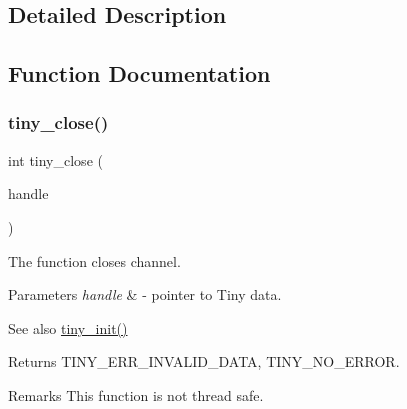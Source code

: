 \subsection{Detailed Description}


\subsection{Function Documentation}
\mbox{\label{group__SIMPLE__API_ga48cf9ffab9eeb9665e61ae69e28938b8}} 
\subsubsection{\texorpdfstring{tiny\+\_\+close()}{tiny\_close()}}
{\footnotesize\ttfamily int tiny\+\_\+close (\begin{DoxyParamCaption}\item[{\hyperlink{structSTinyData}{S\+Tiny\+Data} $\ast$}]{handle }\end{DoxyParamCaption})}

The function closes channel. 
\begin{DoxyParams}{Parameters}
{\em handle} & -\/ pointer to Tiny data. \\
\hline
\end{DoxyParams}
\begin{DoxySeeAlso}{See also}
\hyperlink{group__SIMPLE__API_gab9bfaed3c75551c8b7f3f8b25e766546}{tiny\+\_\+init()} 
\end{DoxySeeAlso}
\begin{DoxyReturn}{Returns}
T\+I\+N\+Y\+\_\+\+E\+R\+R\+\_\+\+I\+N\+V\+A\+L\+I\+D\+\_\+\+D\+A\+TA, T\+I\+N\+Y\+\_\+\+N\+O\+\_\+\+E\+R\+R\+OR. 
\end{DoxyReturn}
\begin{DoxyRemark}{Remarks}
This function is not thread safe. 
\end{DoxyRemark}
\mbox{\label{group__SIMPLE__API_gab9bfaed3c75551c8b7f3f8b25e766546}} 
